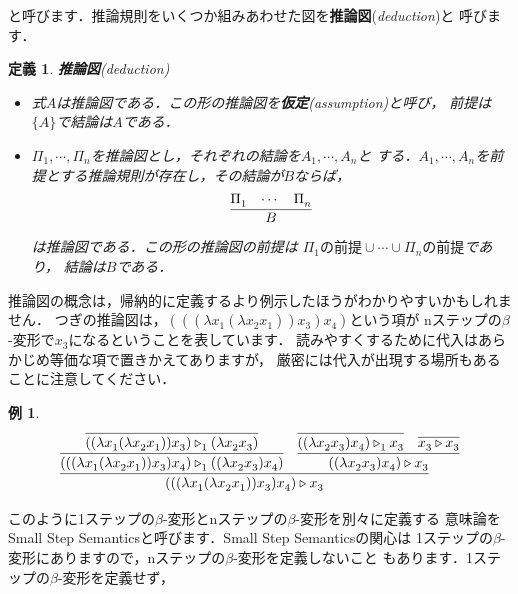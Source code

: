 \documentclass{ltjsbook}%
\newtheorem{definition}{定義}[section]%
\newtheorem{example}{例}[section]%
\newcommand\term[2]{\textbf{#1}{(\textit{#2})}}%
\begin{document}
と呼びます．推論規則をいくつか組みあわせた図を\term{推論図}{deduction}と%
呼びます．%
\begin{definition}%
\term{推論図}{deduction}%
\begin{itemize}%
\item 式$A$は推論図である．この形の推論図を\term{仮定}{assumption}と呼び，%
  前提は$\{A\}$で結論は$A$である．%
\item $\Pi_1^{},\cdots,\Pi_n^{}$を推論図とし，それぞれの結論を$A_1^{},\cdots,A_n^{}$と%
  する．$A_1^{},\cdots,A_n^{}$を前提とする推論規則が存在し，その結論が$B$ならば，%
  \begin{equation}%
    \infer{B}{\Pi_1^{}&\cdots&\Pi_n^{}}%
  \end{equation}%
  は推論図である．この形の推論図の前提は%
  $\Pi_1^{}の前提\cup\cdots\cup\Pi_n^{}の前提$であり，%
  結論は$B$である．%
\end{itemize}%
\end{definition}%
推論図の概念は，帰納的に定義するより例示したほうがわかりやすいかもしれません．%
つぎの推論図は，$(((\lambda x_1^{}(\lambda x_2^{} x_1^{}))x_3^{})x_4^{})$という項が%
nステップの$\beta$-変形で$x_3^{}$になるということを表しています．%
読みやすくするために代入はあらかじめ等価な項で置きかえてありますが，%
厳密には代入が出現する場所もあることに注意してください．%
\begin{example}%
  \begin{equation}%
    \infer{%
      (((\lambda x_1^{}(\lambda x_2^{} x_1^{}))x_3^{})x_4^{})\triangleright x_3^{}%
    }{%
      \infer{%
        (((\lambda x_1^{}(\lambda x_2^{} x_1^{}))x_3^{})x_4^{})\triangleright_1^{}%
        ((\lambda x_2^{} x_3^{})x_4^{})%
      }{%
        \infer{%
          ((\lambda x_1^{}(\lambda x_2^{} x_1^{}))x_3^{})\triangleright_1^{}%
          (\lambda x_2^{} x_3^{})%
        }{%
        }%
      }%
    &%
      \infer{%
        ((\lambda x_2^{} x_3^{})x_4^{})\triangleright x_3^{}%
      }{%
        \infer{%
          ((\lambda x_2^{} x_3^{})x_4^{})\triangleright_1^{}x_3^{}%
        }{%
        }%
      &%
        \infer{%
          x_3^{}\triangleright x_3^{}%
        }{%
        }%
      }%
    }%
  \end{equation}%
\end{example}%
\par このように1ステップの$\beta$-変形とnステップの$\beta$-変形を別々に定義する%
意味論をSmall Step Semanticsと呼びます．Small Step Semanticsの関心は%
1ステップの$\beta$-変形にありますので，nステップの$\beta$-変形を定義しないこと%
もあります．1ステップの$\beta$-変形を定義せず，%
\end{document}
